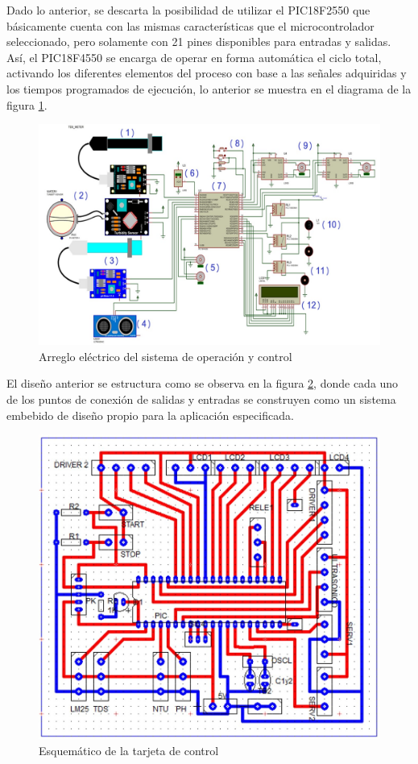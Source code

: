 \documentclass[conference]{IEEEtran}
\begin{document}
Dado lo anterior, se descarta la posibilidad de utilizar el PIC18F2550 que básicamente cuenta con las mismas características que el microcontrolador seleccionado, pero solamente con 21 pines disponibles para entradas y salidas. Así, el PIC18F4550 se encarga de operar en forma automática el ciclo total, activando los diferentes elementos del proceso con base a las señales adquiridas y los tiempos programados de ejecución, lo anterior se muestra en el diagrama de la figura \ref{fig:10}.

\begin{figure}[htbp]
	\centering
	\includegraphics[width=0.8\columnwidth]{fig10.jpg}
	\caption{Arreglo eléctrico del sistema de operación y control}
	\label{fig:10}
\end{figure}
		
El diseño anterior se estructura como se observa en la figura \ref{fig:11}, donde cada uno de los puntos de conexión de salidas y entradas se construyen como un sistema embebido de diseño propio para la aplicación especificada.

\begin{figure}[htbp]
	\centering
	\includegraphics[width=0.8\columnwidth]{fig11.jpg}
	\caption{Esquemático de la tarjeta de control}
	\label{fig:11}
\end{figure}
\end{document}
